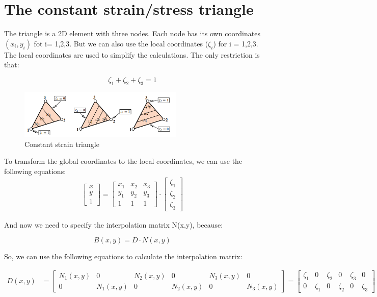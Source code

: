 \documentclass{article}  %
\begin{document}
\newpage
\section{The constant strain/stress triangle}
The triangle is a 2D element with three nodes. Each node has its own coordinates $(x_i,y_i)$ fot i= 1,2,3. But we can also use the local coordinates ($\zeta_i$) for i = 1,2,3. The local coordinates are used to simplify the calculations. The only restriction is that:

$$\zeta_1+\zeta_2+\zeta_3=1$$

\begin{figure}[h]
    \centering
    \includegraphics[width=0.7\textwidth]{Graphics/CST_1.PNG}
    \caption{Constant strain triangle}
    \label{fig:constant_strain_triangle}
\end{figure}

To transform the global coordinates to the local coordinates, we can use the following equations:
\begin{align}
  \begin{bmatrix}
    x \\
    y \\
    1
  \end{bmatrix}
  = 
  \begin{bmatrix}
    x_1 & x_2 & x_3 \\
    y_1 & y_2 & y_3 \\
    1   & 1   & 1
  \end{bmatrix}
  \cdot
  \begin{bmatrix}
    \zeta_1 \\
    \zeta_2 \\
    \zeta_3
  \end{bmatrix}
\end{align}

And now we need to specify the interpolation matrix N(x,y), because: 

$$B(x,y)= D\cdot N(x,y)$$

So, we can use the following equations to calculate the interpolation matrix:

\begin{align}
  D(x,y) &= \begin{bmatrix}
    N_1(x,y) & 0 & N_2(x,y) & 0 & N_3(x,y) & 0 \\
    0 & N_1(x,y) & 0 & N_2(x,y) & 0 & N_3(x,y)
  \end{bmatrix} =
  \begin{bmatrix}
    \zeta_1 & 0 & \zeta_2 & 0 & \zeta_3 & 0 \\
    0 & \zeta_1 & 0 & \zeta_2 & 0 & \zeta_3
  \end{bmatrix} \\
\end{align}
\end{document}
